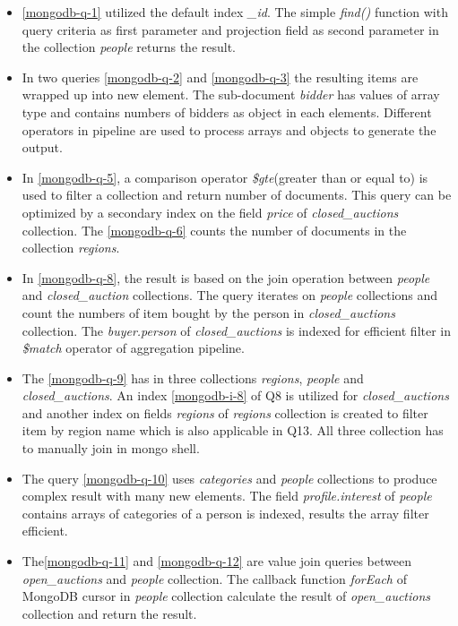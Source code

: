 \begin{itemize}
\item \ref{mongodb-q-1} utilized the default index \textit{\_id}. The simple \textit{find()} function with  query criteria as first parameter and projection field  as second parameter in the collection \textit{people} returns the result.

\item In two queries \ref{mongodb-q-2} and \ref{mongodb-q-3}  the resulting items are wrapped up into new element.  The sub-document \textit{bidder} has values of array type and contains numbers of bidders as object in each elements. Different operators in pipeline are used to process  arrays and objects to generate the output.

\item In \ref{mongodb-q-5}, a comparison operator \textit{\$gte}(greater than or equal to) is used to filter a collection and return number of documents. This query can be optimized by a secondary index on the field \textit{price} of \textit{closed\_auctions} collection.  The \ref{mongodb-q-6} counts the number of documents in the collection \textit{regions}.

\item In \ref{mongodb-q-8}, the result is based on the join operation  between  \textit{people} and \textit{closed\_auction} collections.
The query iterates on \textit{people}  collections and count the numbers of item bought by the person in \textit{closed\_auctions} collection.
The \textit{buyer.person} of \textit{closed\_auctions} is indexed for efficient filter in \textit{\$match} operator of aggregation pipeline.   

 \item 
The  \ref{mongodb-q-9} has in three collections \textit{regions}, \textit{people} and \textit{closed\_auctions}.  An index \ref{mongodb-i-8} of Q8 is utilized for \textit{closed\_auctions} and another index on fields \textit{regions} of \textit{regions} collection is created to filter item by region name which is also applicable in Q13. All three collection has to manually join in mongo shell.

\item The query \ref{mongodb-q-10} uses  \textit{categories} and \textit{people} collections to produce complex result with many new elements. The field \textit{profile.interest} of \textit{people} contains  arrays of categories of a person is indexed, results the array filter efficient.

\item The\ref{mongodb-q-11} and \ref{mongodb-q-12} are value join queries between \textit{open\_auctions} and \textit{people} collection. The callback function \textit{forEach} of MongoDB cursor in  \textit{people} collection calculate the result of \textit{open\_auctions} collection and return the result. 


\end{itemize}
